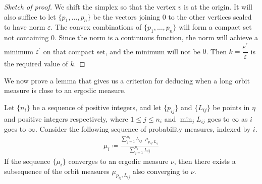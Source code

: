 \documentclass[12pt, reqno]{amsart}
\begin{document}
\begin{proof}[Sketch of proof]
  We shift the simplex so that the vertex $v$ is at the origin.
  It will also suffice to let $\{p_1, \ldots, p_n\}$ be the vectors joining $0$ to the other vertices scaled to have norm $\varepsilon$.
  The convex combinations of $\{p_1, \ldots, p_n\}$ will form a compact set not containing $0$.
  Since the norm is a continuous function, the norm will achieve a minimum $\varepsilon^{\prime}$ on that compact set, and the minimum will not be $0$.
  Then $k = \dfrac{\varepsilon^{\prime}}{\varepsilon}$ is the required value of $k$.
\end{proof}

We now prove a lemma that gives us a criterion for deducing when a long orbit measure is close to an ergodic measure.
\begin{lemma}
  \label{lem:convexity-argument}
  Let $\{n_i\}$ be a sequence of positive integers, and let $\{p_{ij}\}$ and $\{L_{ij}\}$ be points in $\eta$ and positive integers respectively, where $1 \leq j \leq n_i$ and $\min_j L_{ij}$ goes to $\infty$ as $i$ goes to $\infty$.
  Consider the following sequence of probability measures, indexed by $i$.
  \begin{align*}
    \mu_i \coloneqq \frac{\sum_{j=1}^{n_i} L_{ij} \cdot \mu_{p_{ij}, L_{ij}}}{\sum_{j=1}^{n_i} L_{ij}}
  \end{align*}
  If the sequence $\{\mu_i\}$ converges to an ergodic measure $\nu$, then there exists a subsequence of the orbit measures $\mu_{p_{ij}, L_{ij}}$ also converging to $\nu$.
\end{lemma}
\end{document}
